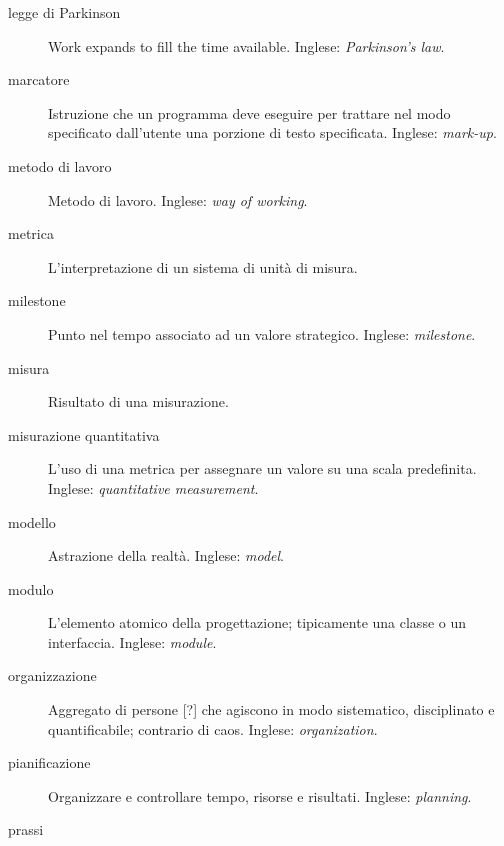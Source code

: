 \documentclass[a4paper]{article}
\begin{document}
\begin{description}
	\item[legge di Parkinson] 

			Work expands to fill the time available. Inglese: \emph{Parkinson's law}.
			
	\item[marcatore] 

			Istruzione che un programma deve eseguire per trattare nel modo specificato dall'utente una porzione di testo specificata. Inglese: \emph{mark-up}.
			
	\item[metodo di lavoro] 

			Metodo di lavoro. Inglese: \emph{way of working}.
			
	\item[metrica] 

			L'interpretazione di un sistema di unità di misura.
			
	\item[milestone] 

			Punto nel tempo associato ad un valore strategico. Inglese: \emph{milestone}.
			
	\item[misura] 

			Risultato di una misurazione.
			
	\item[misurazione quantitativa] 

			L'uso di una metrica per assegnare un valore su una scala predefinita. Inglese: \emph{quantitative measurement}.
			
	\item[modello] 

			Astrazione della realtà. Inglese: \emph{model}.
			
	\item[modulo] 

			L'elemento atomico della progettazione; tipicamente una classe o un interfaccia. Inglese: \emph{module}.
			
	\item[organizzazione] 

			Aggregato di persone [?] che agiscono in modo sistematico, disciplinato e quantificabile; contrario di caos. Inglese: \emph{organization}.
			
	\item[pianificazione] 

			Organizzare e controllare tempo, risorse e risultati. Inglese: \emph{planning}.
			
	\item[prassi] 


\end{description}
\end{document}
